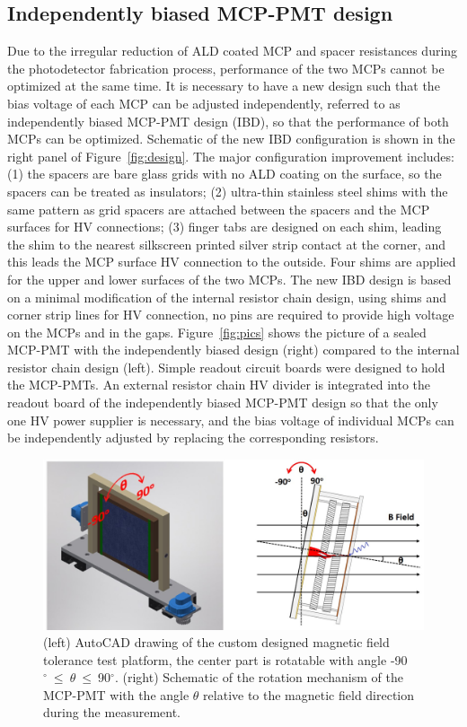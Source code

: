 \documentclass[preprint,5p]{elsarticle}
\begin{document}
\subsection{Independently biased MCP-PMT design} \label{sec_design}
Due to the irregular reduction of ALD coated MCP and spacer resistances during 
the photodetector fabrication process, performance of the two MCPs cannot be 
optimized at the same time. It is necessary to have a new design such that the bias 
voltage of each MCP can be adjusted independently, referred to as independently 
biased MCP-PMT design (IBD), so that the performance of both MCPs can be 
optimized. Schematic of the new IBD configuration is shown in the right panel 
of Figure~\ref{fig:design}. The major configuration improvement includes: (1) 
the spacers are bare glass grids with no ALD coating on the surface, so the 
spacers can be treated as insulators; (2) ultra-thin stainless steel shims with 
the same pattern as grid spacers are attached between the spacers and the MCP 
surfaces for HV connections; (3) finger tabs are designed on each shim, leading 
the shim to the nearest silkscreen printed silver strip contact at the corner, 
and this leads the MCP surface HV connection to the outside. Four shims are 
applied for the upper and lower surfaces of the two MCPs. The new IBD design is 
based on a minimal modification of the internal resistor chain design, using 
shims and corner strip lines for HV connection, no pins are required to provide 
high voltage on the MCPs and in the gaps. Figure~\ref{fig:pics} shows the 
picture of a sealed MCP-PMT with the independently biased design (right) 
compared to the internal resistor chain design (left). Simple readout circuit 
boards were designed to hold the MCP-PMTs. An external resistor chain HV 
divider is integrated into the readout board of the independently biased 
MCP-PMT design so that the only one HV power supplier is necessary, and the 
bias voltage of individual MCPs can be independently adjusted by replacing the 
corresponding resistors. 

\begin{figure}[tbp]
\centering \includegraphics[scale=0.6]{fig/Figure3.jpg}
\caption{(left) AutoCAD drawing of the custom designed magnetic field tolerance 
   test platform, the center part is rotatable with angle 
   -90$^{\circ}~\leq~\theta~\leq~$90$^{\circ}$.  (right) Schematic of the 
   rotation mechanism of the MCP-PMT with the angle $\theta$ relative to the 
   magnetic field direction during the measurement. } \label{fig:theta}
\end{figure}
\end{document}

